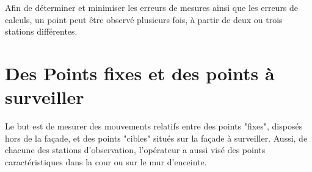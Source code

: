 Afin de déterminer et minimiser les erreurs de mesures ainsi que les erreurs de calculs, un point peut être observé plusieurs fois, à partir de deux ou trois stations différentes.

\section{Des Points fixes et des points à surveiller}

Le but est de mesurer des mouvements relatifs entre des points "fixes", disposés hors de la façade, et des points "cibles" situés sur la façade à surveiller.
Aussi, de chacune des stations d'observation, l'opérateur a aussi visé des points caractéristiques dans la cour ou sur le mur d'enceinte.


